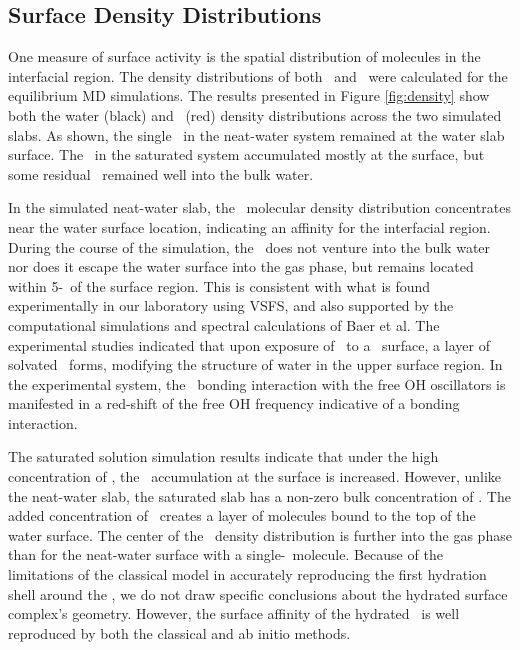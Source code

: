 \subsection{Surface Density Distributions}

One measure of surface activity is the spatial distribution of molecules in the interfacial region. The density distributions of both \wat~and \suldiox~were calculated for the equilibrium MD simulations. The results presented in Figure \ref{fig:density} show both the water (black) and \suldiox~(red) density distributions across the two simulated slabs. As shown, the single \suldiox~in the neat-water system remained at the water slab surface. The \suldiox~in the saturated system accumulated mostly at the surface, but some residual \suldiox~remained well into the bulk water.



In the simulated neat-water slab, the \suldiox~molecular density distribution concentrates near the water surface location, indicating an affinity for the interfacial region. During the course of the simulation, the \suldiox~does not venture into the bulk water nor does it escape the water surface into the gas phase, but remains located within 5-\angs~of the surface region. This is consistent with what is found experimentally in our laboratory using VSFS,\cite{Tarbuck2005,Tarbuck2006} and also supported by the computational simulations and spectral calculations of Baer et al.\cite{Baer2010} The experimental studies indicated that upon exposure of \suldiox~to a \wat~surface, a layer of solvated \suldiox~forms, modifying the structure of water in the upper surface region. In the experimental system, the \suldiox~bonding interaction with the free OH oscillators is manifested in a red-shift of the free OH frequency indicative of a bonding interaction. 

The saturated solution simulation results indicate that under the high concentration of \suldiox, the \suldiox~accumulation at the surface is increased. However, unlike the neat-water slab, the saturated slab has a non-zero bulk concentration of \suldiox. The added concentration of \suldiox~creates a layer of molecules bound to the top of the water surface. The center of the \suldiox~density distribution is further into the gas phase than for the neat-water surface with a single-\suldiox~molecule. Because of the limitations of the classical model in accurately reproducing the first hydration shell around the \suldiox,\cite{Baer2010} we do not draw specific conclusions about the hydrated surface complex's geometry. However, the surface affinity of the hydrated \suldiox~is well reproduced by both the classical and ab initio methods.

